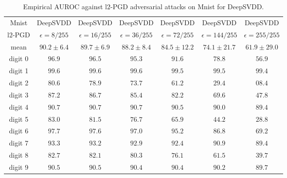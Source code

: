 \begin{table}%
    \centering
    \small
    \begin{tabular}{|c|cccccc|}
    \hline
      Mnist & DeepSVDD & DeepSVDD & DeepSVDD & DeepSVDD & DeepSVDD & DeepSVDD \\
      l$2$-PGD & $\epsilon=8/255$ & $\epsilon=16/255$ & $\epsilon=36/255$ & $\epsilon=72/255$ & $\epsilon=144/255$ & $\epsilon=255/255$\\
    \hline
    \hline
    mean & $90.2\pm 6.4$ & $89.7\pm 6.9$ & $88.2\pm 8.4$ & $84.5\pm 12.2$ & $74.1\pm 21.7$ & $61.9\pm 29.0$\\
    \hline
    digit 0 & $96.9$ & $96.5$ & $95.3$ & $91.6$ & $78.8$ & $56.9$\\
    digit 1 & $99.6$ & $99.6$ & $99.6$ & $99.5$ & $99.5$ & $99.4$\\
    digit 2 & $80.6$ & $78.9$ & $73.7$ & $61.2$ & $29.4$ & $08.4$\\
    digit 3 & $87.2$ & $86.7$ & $85.4$ & $82.2$ & $69.6$ & $47.8$\\
    digit 4 & $90.7$ & $90.7$ & $90.7$ & $90.5$ & $90.0$ & $89.4$\\
    digit 5 & $83.0$ & $81.5$ & $76.7$ & $65.9$ & $44.2$ & $28.8$\\
    digit 6 & $97.7$ & $97.6$ & $97.0$ & $95.2$ & $86.8$ & $69.2$\\
    digit 7 & $93.3$ & $93.2$ & $92.9$ & $92.4$ & $90.9$ & $89.4$\\
    digit 8 & $82.7$ & $82.1$ & $80.3$ & $76.1$ & $61.5$ & $39.7$\\
    digit 9 & $90.5$ & $90.5$ & $90.4$ & $90.4$ & $90.2$ & $89.7$\\
    \hline
    \end{tabular}
    \caption{Empirical AUROC against l$2$-PGD adversarial attacks on Mnist for DeepSVDD.}
    \label{tab:empiricalmnistsvdd}
\end{table}

